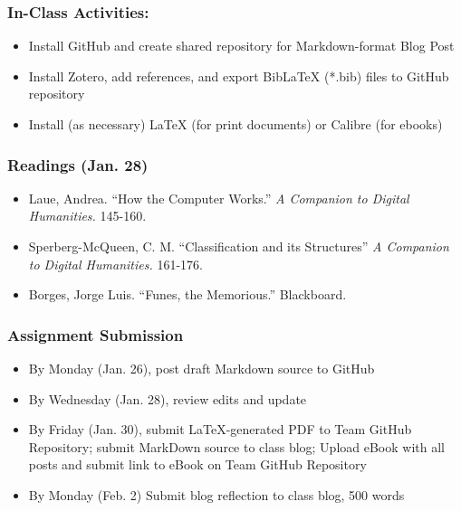 \documentclass[]{article}
\begin{document}
\subsubsection{In-Class Activities:}\label{in-class-activities-1}

\begin{itemize}
\itemsep1pt\parskip0pt
\item
  Install GitHub and create shared repository for Markdown-format Blog
  Post
\item
  Install Zotero, add references, and export BibLaTeX (*.bib) files to
  GitHub repository
\item
  Install (as necessary) LaTeX (for print documents) or Calibre (for
  ebooks)
\end{itemize}

\subsubsection{Readings (Jan. 28)}\label{readings-jan.-28}

\begin{itemize}
\itemsep1pt\parskip0pt
\item
  Laue, Andrea. ``How the Computer Works.'' \emph{A Companion to Digital
  Humanities.} 145-160.
\item
  Sperberg-McQueen, C. M. ``Classification and its Structures'' \emph{A
  Companion to Digital Humanities.} 161-176.
\item
  Borges, Jorge Luis. ``Funes, the Memorious.'' Blackboard.
\end{itemize}

\subsubsection{Assignment Submission}\label{assignment-submission}

\begin{itemize}
\itemsep1pt\parskip0pt
\item
  By Monday (Jan. 26), post draft Markdown source to GitHub
\item
  By Wednesday (Jan. 28), review edits and update
\item
  By Friday (Jan. 30), submit LaTeX-generated PDF to Team GitHub
  Repository; submit MarkDown source to class blog; Upload eBook with
  all posts and submit link to eBook on Team GitHub Repository
\item
  By Monday (Feb. 2) Submit blog reflection to class blog, 500 words
\end{itemize}
\end{document}
